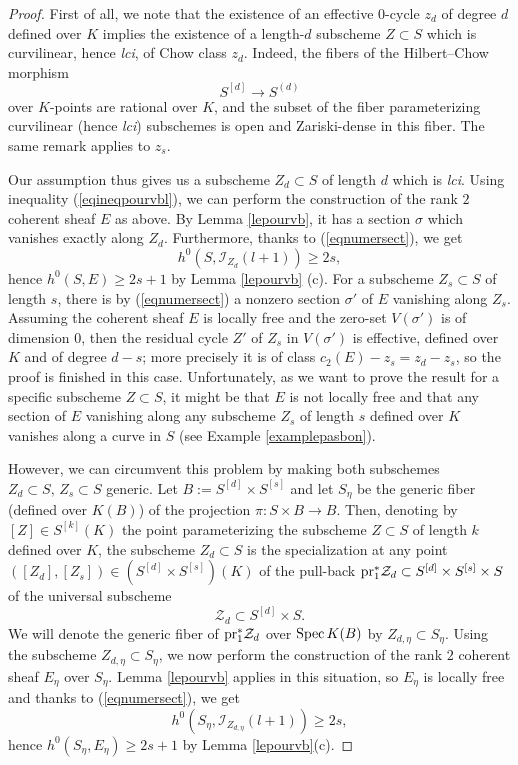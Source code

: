 \documentclass[10pt]{article}
\begin{document}
\begin{proof} First of all, we note that the existence of an effective $0$-cycle $z_d$ of degree $d$  defined over $K$ implies the existence of a length-$d$ subscheme $Z\subset S$ which is curvilinear, hence {\it lci}, of Chow class $z_d$. Indeed, the fibers of the Hilbert--Chow morphism
$$S^{[d]}\rightarrow S^{(d)}$$
over  $K$-points  are rational over $K$, and the subset of the fiber parameterizing curvilinear (hence {\it lci}) subschemes is open and Zariski-dense in this fiber.  The same remark applies to $z_s$.

Our assumption thus gives us a subscheme $Z_d\subset S$ of length $d$ which is {\it lci}. Using inequality (\ref{eqineqpourvbl}), we can perform the construction of the rank $2$ coherent sheaf $E$ as above. By Lemma \ref{lepourvb}, it has a section $\sigma$ which vanishes exactly along $Z_d$. Furthermore, thanks to (\ref{eqnumersect}), we get
$$h^0(S,\mathcal{I}_{Z_d}(l+1))\geq 2s,$$ hence
 $h^0(S,E)\geq 2s+1$ by Lemma \ref{lepourvb} (c). For a  subscheme $Z_s\subset S$ of length $s$, there is by (\ref{eqnumersect}) a nonzero section $\sigma'$ of $E$ vanishing along $Z_s$.
 Assuming the coherent sheaf $E$ is locally free and the zero-set  $V(\sigma')$ is of dimension $0$, then the residual cycle $Z'$ of $Z_s$ in $V(\sigma')$ is effective, defined over $K$ and of degree $d-s$; more precisely it is of class $c_2(E)-z_s=z_d-z_s$, so the proof is finished in this case.
Unfortunately, as we want to prove the result for a specific subscheme $Z\subset S$, it might be that $E$ is not locally free    and that any section of $E$ vanishing along any  subscheme $Z_s$ of length $s$ defined over $K$ vanishes along a curve in $S$ (see Example \ref{examplepasbon}).

However, we can circumvent this problem by  making both subschemes $Z_d\subset S,\,Z_s\subset S $ generic. Let $B:=S^{[d]}\times S^{[s]}$ and let $S_\eta$ be the generic fiber (defined over $K(B)$) of the projection $\pi: S\times B\rightarrow B$. Then, denoting by $[Z]\in S^{[k]}(K)$ the point parameterizing the subscheme $Z\subset S$ of length $k$ defined over $K$,  the subscheme $Z_d\subset S$  is the specialization at any point $([Z_d], [Z_s])\in (S^{[d]}\times S^{[s]}) (K)$
of   the pull-back ${\rm pr}_1^*\mathcal{Z}_d\subset  S^{[d]}\times S^{[s]}\times S$ of the universal subscheme
$$\mathcal{Z}_d\subset S^{[d]}\times S.$$
We will denote the generic fiber  of ${\rm pr}_1^*\mathcal{Z}_d$ over ${\rm Spec}\,K(B)$ by $Z_{d,\eta}\subset S_\eta$.
Using the subscheme $Z_{d,\eta}\subset S_\eta$, we now perform the construction of the  rank $2$ coherent sheaf  $E_\eta$ over $S_\eta$. Lemma \ref{lepourvb} applies in this situation, so $E_\eta$ is locally free and
thanks to (\ref{eqnumersect}), we get
$$h^0(S_\eta,\mathcal{I}_{Z_{d,\eta}}(l+1))\geq 2s,$$ hence
 $h^0(S_\eta,E_\eta)\geq 2s+1$ by Lemma \ref{lepourvb}(c).


\end{proof}
\end{document}
